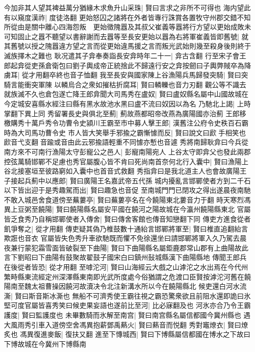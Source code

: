 今加非其人望其裨益萬分猶緣木求魚升山采珠|{
	賢曰言求之非所不可得也}
海内望此有以窺度漢祚|{
	度徒洛翻}
更始怒囚之諸將在外者皆專行誅賞各置牧守州郡交錯不知所從由是關中離心四海怨叛　更始徵隗囂及其叔父崔義等囂將行方望以更始成敗未可知固止之囂不聽望以書辭謝而去囂等至長安更始以囂為右將軍崔義皆即舊號|{
	就其舊號以授之隗囂違方望之言而從更始違馬援之言而叛光武始則幾至殺身後則終于滅族擇木之難也}
耿况遣其子弇奉奏詣長安弇時年二十一|{
	弇古含翻}
行至宋子會王郎起弇從吏孫倉衛包曰劉子輿成帝正統捨此不歸遠行安之弇按劒曰子輿弊賊卒為降虜耳|{
	從才用翻卒終也音子恤翻}
我至長安與國家陳上谷漁陽兵馬歸發突騎|{
	賢曰突騎言能衝突軍陳}
以轔烏合之衆如摧枯折腐耳|{
	賢曰轔轢也音力刃翻}
觀公等不識去就族滅不久也倉包遂亡降王郎弇聞大司馬秀在盧奴|{
	賢曰盧奴縣名屬中山國故城在今定城安喜縣水經注曰縣有黑水故池水黑曰盧不流曰奴因以為名}
乃馳北上謁|{
	上時掌翻下異上同}
秀留署長史與俱北至薊|{
	薊故燕都昭帝改燕為廣陽國亦治薊}
王郎移檄購秀十萬戶秀令功曹令史潁川王霸至市中募人擊王郎|{
	漢舊注公府令史秩百石霸時為大司馬功曹令史}
市人皆大笑舉手邪揄之霸慚懅而反|{
	賢曰說文曰歋手相笑也歋音弋支翻音踰或音由此云邪揄語輕重不同懅亦慙也音遽}
秀將南歸耿弇曰今兵從南方來不可南行漁陽太守彭寵公之邑人|{
	彭寵南陽宛人}
上谷太守即弇父也發此兩郡控弦萬騎邯鄲不足慮也秀官屬腹心皆不肯曰死尚南首奈何北行入囊中|{
	賢曰漁陽上谷北接塞垣至彼路窮如入囊中也首音式救翻}
秀指弇曰是我北道主人也會故廣陽王子接起兵薊中以應郎|{
	賢曰廣陽王名嘉武帝五代孫}
城内擾亂言邯鄲使者方到二千石以下皆出迎于是秀趣駕而出|{
	賢曰趣急也音促}
至南城門門已閉攻之得出遂晨夜南馳不敢入城邑舍食道傍至蕪蔞亭|{
	賢曰蕪蔞亭名在今饒陽東北蔞音力于翻}
時天寒烈馮異上豆粥至饒陽|{
	賢曰饒陽縣名屬安平國在饒河之陽故城在今瀛州饒陽縣東北}
官屬皆乏食秀乃自稱邯鄲使者入傳舍|{
	賢曰傳舍客館也傳音知戀翻下同}
傳吏方進食從者飢爭奪之|{
	從才用翻}
傳吏疑其偽乃椎鼓數十通紿言邯鄲將軍至|{
	賢曰椎直追翻紿言欺誑也音衣}
官屬皆失色秀升車欲馳既而懼不免徐還坐曰請邯鄲將軍入久乃駕去晨夜兼行蒙犯霜雪面皆破裂至下曲陽|{
	賢曰下曲陽縣名屬鉅鹿郡常山郡有上曲陽故此言下劉昭曰下曲陽有鼓聚故翟鼓子國宋白曰鎮州鼔城縣漢下曲陽縣地}
傳聞王郎兵在後從者皆恐|{
	從才用翻}
至嘑沱河|{
	賢曰山海經云大戲之山滹沱之水出焉在今代州繁畤縣東流經定州深澤縣東南即光武所度處今俗猶謂之危渡口臣賢按滹沱河舊在饒陽南至魏太祖曹操因饒河故瀆决令北注新溝水所以今在饒陽縣北}
候吏還白河水流澌|{
	賢曰斯音斯冰澌也}
無船不可濟秀使王霸往視之霸恐驚衆欲且前阻水還即詭曰氷堅可度官屬皆喜秀笑曰候吏果妄語也遂前比至河|{
	比必寐翻及也}
河氷亦合乃令王霸護度|{
	賢曰監護度也}
未畢數騎而氷解至南宫|{
	賢曰南宫縣名屬信都國今冀州縣也}
遇大風雨秀引車入道傍空舍馮異抱薪鄧禹爇火|{
	賢曰爇音而悦翻}
秀對竈燎衣|{
	賢曰燎炙也}
馮異復進麥飯|{
	復扶又翻}
進至下慱城西|{
	賢曰下博縣屬信都國在博水之下故曰下博故城在今冀州下博縣南}
